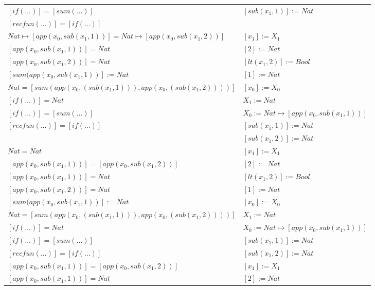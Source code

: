 \begin{exercise}
\begin{description}
\begin{center}
\begin{longtable}{ | l | l | }
                        $[if(...)] = [sum(...)]$ & $[sub(x_1,1)] := Nat$\\
                        $[recfun(...)] = [if(...)]$ & \\
                    \hline
                        $Nat \mapsto [app(x_0, sub(x_1,1))] = Nat \mapsto [app(x_0, sub(x_1,2))]$ & $[x_1] := X_1$\\
                        $[app(x_0, sub(x_1,1))] = Nat$ & $[2] := Nat$\\
                        $[app(x_0, sub(x_1,2))] = Nat$ & $[lt(x_1 , 2)] := Bool$\\
                        $[sum(app(x_0, sub(x_1,1))] := Nat$ &  $[1] := Nat$\\
                        $Nat = [sum(app(x_0, (sub(x_1,1))), app(x_0, (sub(x_1,2))))]$ & $[x_0] := X_0$\\
                        $[if(...)] = Nat$ & $X_1 := Nat$\\
                        $[if(...)] = [sum(...)]$ & $X_0 := Nat \mapsto [app(x_0, sub(x_1,1))]$\\
                        $[recfun(...)] = [if(...)]$ & $[sub(x_1,1)] := Nat$\\
                        & $[sub(x_1,2)] := Nat$ \\
                    \hline
                        $Nat = Nat$ & $[x_1] := X_1$\\
			     $[app(x_0, sub(x_1,1))] = [app(x_0, sub(x_1,2))]$ & $[2] := Nat$\\
                        $[app(x_0, sub(x_1,1))] = Nat$ &  $[lt(x_1 , 2)] := Bool$\\
                        $[app(x_0, sub(x_1,2))] = Nat$ &  $[1] := Nat$\\
                        $[sum(app(x_0, sub(x_1,1))] := Nat$ &  $[x_0] := X_0$\\
                        $Nat = [sum(app(x_0, (sub(x_1,1))), app(x_0, (sub(x_1,2))))]$ & $X_1 := Nat$\\
                        $[if(...)] = Nat$ & $X_0 := Nat \mapsto [app(x_0, sub(x_1,1))]$\\
                        $[if(...)] = [sum(...)]$ & $[sub(x_1,1)] := Nat$\\
                        $[recfun(...)] = [if(...)]$ & $[sub(x_1,2)] := Nat$ \\
                    \hline
			     $[app(x_0, sub(x_1,1))] = [app(x_0, sub(x_1,2))]$ &   $[x_1] := X_1$\\ 
                        $[app(x_0, sub(x_1,1))] = Nat$ & $[2] := Nat$\\ 

\end{longtable}
\end{center}
\end{description}
\end{exercise}
